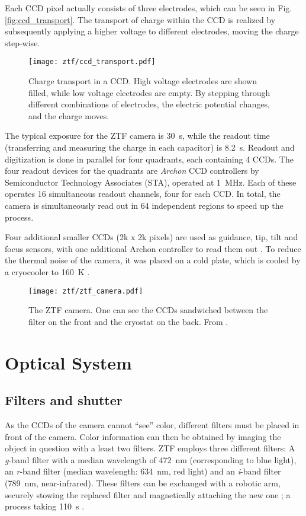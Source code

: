 Each CCD pixel actually consists of three electrodes, which can be seen in Fig. \ref{fig:ccd_transport}. The transport of charge within the CCD is realized by subsequently applying a higher voltage to different electrodes, moving the charge step-wise. 

\begin{figure}[htb]
    \texttt{[image: ztf/ccd\_transport.pdf]}
    \caption[Charge transport in a CCD]{Charge transport in a CCD. High voltage electrodes are shown filled, while low voltage electrodes are empty. By stepping through different combinations of electrodes, the electric potential changes, and the charge moves.}
\end{figure}

The typical exposure for the ZTF camera is \SI{30}{\second}, while the readout time (transferring and measuring the charge in each capacitor) is \SI{8.2}{\second}. Readout and digitization is done in parallel for four quadrants, each containing 4 CCDs. The four readout devices for the quadrants are \textit{Archon} CCD controllers by Semiconductor Technology Associates (STA), operated at \SI{1}{\mega\Hz}. Each of these operates 16 simultaneous readout channels, four for each CCD. In total, the camera is simultaneously read out in 64 independent regions to speed up the process.

Four additional smaller CCDs (2k x 2k pixels) are used as guidance, tip, tilt and focus sensors, with one additional Archon controller to read them out . To reduce the thermal noise of the camera, it was placed on a cold plate, which is cooled by a cryocooler to \SI{160}{\kelvin} \cite{Dekany2016}.

\begin{figure}[htb]
    \texttt{[image: ztf/ztf\_camera.pdf]}
    \caption[ZTF camera]{The ZTF camera. One can see the CCDs sandwiched between the filter on the front and the cryostat on the back. From \cite{Bellm2019}.}
\end{figure}

\section{Optical System}

\subsection{Filters and shutter}
As the CCDs of the camera cannot ``see'' color, different filters must be placed in front of the camera. Color information can then be obtained by imaging the object in question with a least two filters. ZTF employs three different filters: A \textit{g}-band filter with a median wavelength of \SI{472}{\nano \meter} (corresponding to blue light), an \textit{r}-band filter (median wavelength: \SI{634}{\nano \meter}, red light) and an \textit{i}-band filter (\SI{789}{\nano \meter}, near-infrared). These filters can be exchanged with a robotic arm, securely stowing the replaced filter and magnetically attaching the new one \cite{Dekany2020}; a process taking \SI{110}{\second} \cite{Bellm2019}. 

